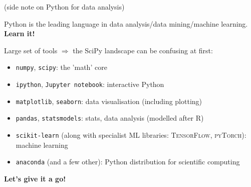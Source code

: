 \documentclass[compress]{beamer}
\begin{document}
\begin{frame}{(side note on Python for data analysis)}

    Python is the leading language in data analysis/data mining/machine
    learning. \textbf{Learn it!}

    \pause

    Large set of tools $\Rightarrow$ the SciPy landscape can be confusing at first:

    \pause

    \begin{itemize}
        \item<+-> \texttt{numpy}, \texttt{scipy}: the 'math' core
        \item<+-> \texttt{ipython}, \texttt{Jupyter notebook}: interactive Python
        \item<+-> \texttt{matplotlib}, \texttt{seaborn}: data visualisation
            (including plotting)
        \item<+-> \texttt{pandas}, \texttt{statsmodels}: stats, data analysis (modelled after R)
        \item<+-> \texttt{scikit-learn} (along with specialist ML libraries:
            \textsc{TensorFlow}, \textsc{pyTorch}): machine learning
        \item<+-> \texttt{anaconda} (and a few other): Python distribution for
            scientific computing
    \end{itemize}

\end{frame}

\begin{frame}[plain]
    \Large
    \bf
    \centering
    Let's give it a go!
\end{frame}
\end{document}

